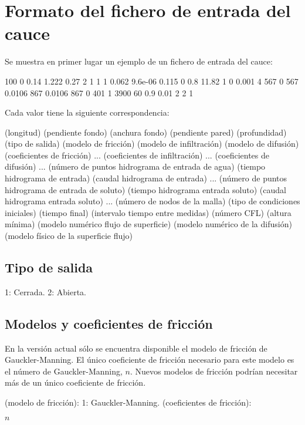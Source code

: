 \documentclass[a4paper,12pt]{report}
\begin{document}
\section{Formato del fichero de entrada del cauce}
Se muestra en primer lugar un ejemplo de un fichero de entrada del cauce:

{\footnotesize
\begin{boxedverbatim}
100 0 0.14 1.222 0.27
2
1 1 1
0.062
9.6e-06 0.115 0 0.8
11.82
1
0 0.001
4
567 0
567 0.0106
867 0.0106
867 0
401 1
3900 60 0.9 0.01
2 2
1
\end{boxedverbatim}
}

Cada valor tiene la siguiente correspondencia:

{\footnotesize
\begin{boxedverbatim}
(longitud) (pendiente fondo) (anchura fondo) (pendiente pared) (profundidad)
(tipo de salida)
(modelo de fricción) (modelo de infiltración) (modelo de difusión)
(coeficientes de fricción) ...
(coeficientes de infiltración) ...
(coeficientes de difusión) ...
(número de puntos hidrograma de entrada de agua)
(tiempo hidrograma de entrada) (caudal hidrograma de entrada)
...
(número de puntos hidrograma de entrada de soluto)
(tiempo hidrograma entrada soluto) (caudal hidrograma entrada soluto)
...
(número de nodos de la malla) (tipo de condiciones iniciales)
(tiempo final) (intervalo tiempo entre medidas) (número CFL) (altura mínima)
(modelo numérico flujo de superficie) (modelo numérico de la difusión)
(modelo físico de la superficie flujo)
\end{boxedverbatim}
}

\subsection{Tipo de salida}
\begin{verbatimtab}
	1: Cerrada.
	2: Abierta.
\end{verbatimtab}

\subsection{Modelos y coeficientes de fricción}
En la versión actual sólo se encuentra disponible el modelo de fricción de Gauckler-Manning. El único coeficiente de fricción necesario para este modelo es el número de Gauckler-Manning, $n$. Nuevos modelos de fricción podrían necesitar más de un único coeficiente de fricción.
\begin{verbatimtab}[4]
(modelo de fricción): 
		1: Gauckler-Manning.
(coeficientes de fricción):
\end{verbatimtab}
\vspace{-0.60cm}
\hspace{1.8cm}$n$
\end{document}
